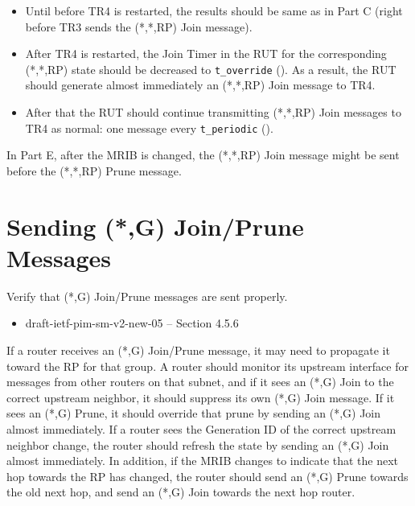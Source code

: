 \documentclass[11pt]{report}
\begin{document}

\begin{itemize}

  \item Until before TR4 is restarted, the results should
  be same as in Part C (right before TR3 sends the (*,*,RP) Join message).

  \item After TR4 is restarted,
  the Join Timer in the RUT for the corresponding (*,*,RP) state
  should be decreased to \verb=t_override= ({\PimsmTOverride}). As a result,
  the RUT should generate almost immediately an (*,*,RP) Join message to TR4.

  \item After that the RUT should continue transmitting 
  (*,*,RP) Join messages to TR4 as normal: one message every \verb=t_periodic=
  ({\PimsmTPeriodic}).

\end{itemize}


In Part E, after the MRIB is changed, the (*,*,RP) Join message might
be sent before the (*,*,RP) Prune message.

\newpage
\section{Sending (*,G) Join/Prune Messages}

Verify that (*,G) Join/Prune messages are sent properly.

\begin{itemize}
  \item draft-ietf-pim-sm-v2-new-05 -- Section 4.5.6
\end{itemize}

If a router receives an (*,G) Join/Prune message, it may need to propagate
it toward the RP for that group. A router should monitor its upstream
interface for messages
from other routers on that subnet, and if it sees an (*,G) Join to the
correct upstream neighbor, it should suppress its own (*,G) Join message.
If it sees an (*,G) Prune, it should override that prune by sending an
(*,G) Join almost immediately. If a router sees the Generation ID of the
correct upstream neighbor change, the router should refresh the state by
sending an (*,G) Join almost immediately. In addition, if the MRIB changes
to indicate that the next hop towards the RP has changed, the router should
send an (*,G) Prune towards the old next hop, and send an (*,G) Join
towards the next hop router.
\end{document}
